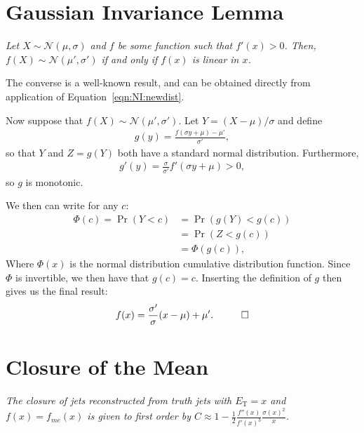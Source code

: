 \section{Gaussian Invariance Lemma}
\label{sec:NI:lemma}

{\it Let $X\sim \mathcal{N}(\mu,\sigma)$ and $f$ be some function such that $f'(x)>0$.  Then, $f(X)\sim\mathcal{N}(\mu',\sigma')$ if and only if $f(x)$ is linear in $x$.}

\vspace{5mm}

 The converse is a well-known result, and can be obtained directly from application of Equation~\ref{eqn:NI:newdist}.

Now suppose that $f(X)\sim\mathcal{N}(\mu',\sigma')$.  Let $Y=(X-\mu)/\sigma$ and define 
\begin{align}
g(y)=\frac{f(\sigma y+\mu)-\mu'}{\sigma'},
\end{align}
so that $Y$ and $Z=g(Y)$ both have a standard normal distribution. Furthermore,
\begin{align}
g'(y) = \frac{\sigma}{\sigma'}f'(\sigma y+\mu) > 0,
\end{align}
so $g$ is monotonic.

We then can write for any $c$:
\begin{align}
\nonumber
\Phi(c)=\Pr(Y<c)&=\Pr(g(Y)<g(c))\\\nonumber
&=\Pr(Z<g(c))\\
&=\Phi(g(c)),
\end{align}
Where $\Phi(x)$ is the normal distribution cumulative distribution function. Since $\Phi$ is invertible, we then have that $g(c)=c$.  Inserting the definition of $g$ then gives us the final result:
\begin{align}
f(x)=\frac{\sigma'}{\sigma} (x-\mu)+\mu'.\hspace{1 cm}\Box
\end{align}

\section{Closure of the Mean}
\label{sec:NI:mean_nonclosure}
{\it The closure of jets reconstructed from truth jets with $E_\text{T} = x$ and $f(x)=f_{me}(x)$ is given to first order by $C\approx 1-\frac{1}{2}\frac{f''(x)}{f'(x)^3}\frac{\sigma(x)^2}{x}$.}

\vspace{5mm}

